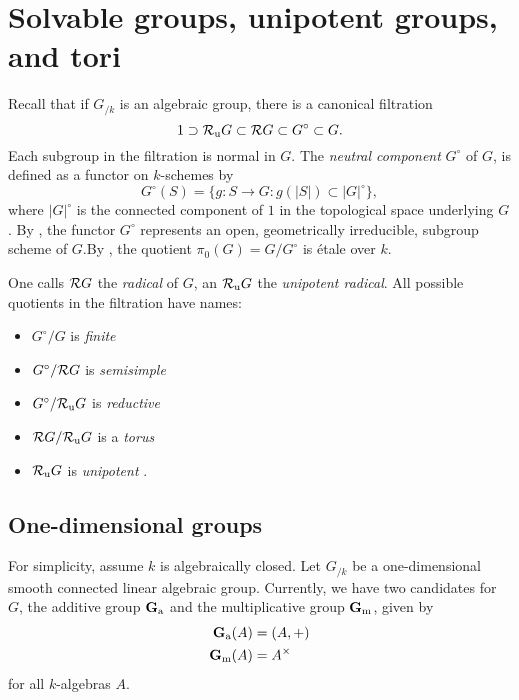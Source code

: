 
\section{Solvable groups, unipotent groups, and tori}

Recall that if $G_{/k}$ is an algebraic group, there is a canonical filtration 
\[
  1\supset \mathcal{R}_\mathrm{u} G\subset \mathcal{R} G\subset G^\circ \subset G .
\]
Each subgroup in the filtration is normal in $G$. The \emph{neutral 
component} $G^\circ$ of $G$, is defined as a functor on $k$-schemes by 
\[
  G^\circ(S) = \{g:S\to G:g(|S|)\subset |G|^\circ\} ,
\]
where $|G|^\circ$ is the connected component of $1$ in the topological space 
underlying $G$. By \cite[VI\textsubscript{A} 2.3.1, 2.4]{sga3-i}, the functor $G^\circ$ 
represents an open, geometrically irreducible, subgroup scheme of $G$.By 
\cite[VI\textsubscript{A} 5.5.1]{sga3-i}, the quotient $\pi_0(G)=G/G^\circ$ is 
\'etale over $k$. 

One calls $\mathcal{R} G$ the \emph{radical} of $G$, an $\mathcal{R}_\mathrm{u} G$ the \emph{unipotent 
radical}. All possible quotients in the filtration have names: 
\begin{itemize}
  \item $G^\circ/G$ is \emph{finite}
  \item $G^\circ/\mathcal{R} G$ is \emph{semisimple}
  \item $G^\circ/\mathcal{R}_\mathrm{u} G$ is \emph{reductive}
  \item $\mathcal{R} G/\mathcal{R}_\mathrm{u} G$ is a \emph{torus}
  \item $\mathcal{R}_\mathrm{u} G$ is \emph{unipotent} .
\end{itemize}





\subsection{One-dimensional groups}

For simplicity, assume $k$ is algebraically closed. Let $G_{/k}$ be a 
one-dimensional smooth connected linear algebraic group. Currently, we have 
two candidates for $G$, the additive group $\mathbf{G}_\mathrm{a}$ and the multiplicative 
group $\mathbf{G}_\mathrm{m}$, given by 
\begin{align*}
  \mathbf{G}_\mathrm{a}(A) &= (A,+) \\
  \mathbf{G}_\mathrm{m}(A) &= A^\times 
\end{align*}
for all $k$-algebras $A$. 

